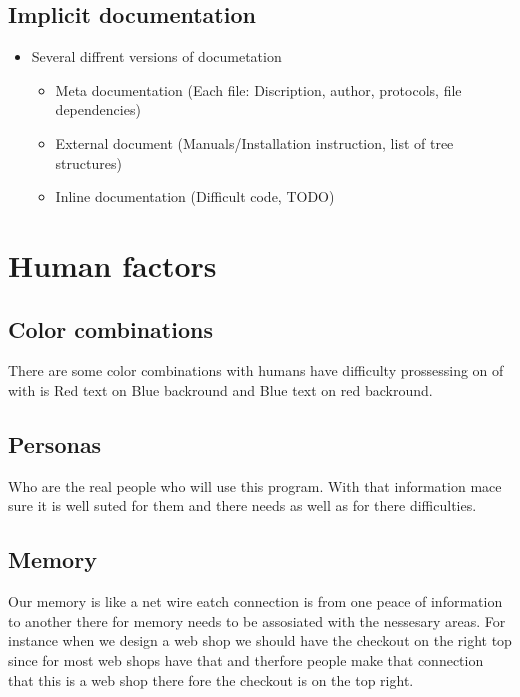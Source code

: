 \subsection{Implicit documentation}
\begin{itemize}
\item Several diffrent versions of documetation
  \begin{itemize}
  \item Meta documentation (Each file: Discription, author, protocols, file dependencies)
  \item External document (Manuals/Installation instruction, list of tree structures)
  \item Inline documentation (Difficult code, TODO)
  \end{itemize}
\end{itemize}


\section{Human factors}
\subsection{Color combinations}
There are some color combinations with humans have difficulty prossessing on of with is
Red text on Blue backround and Blue text on red backround.

\subsection{Personas}
Who are the real people who will use this program. With that information mace sure it
is well suted for them and there needs as well as for there difficulties.

\subsection{Memory}
Our memory is like a net wire eatch connection is from one peace of information to another
there for memory needs to be assosiated with the nessesary areas. For instance when we
design a web shop we should have the checkout on the right top since for most web shops have
that and therfore people make that connection that this is a web shop there fore the checkout
is on the top right.

